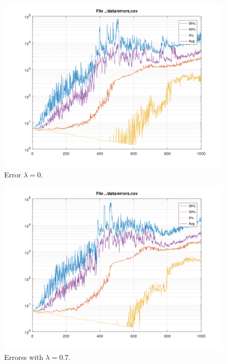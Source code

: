 \documentclass[a4paper,11pt]{article}
\begin{document}
\begin{figure}
	\includegraphics[width=\linewidth]{errors-0.png}
	\caption{Error $\lambda=0$.}
	\label{fig:errors01}
\end{figure}
\begin{figure}
	\includegraphics[width=\linewidth]{errors-07.png}
	\caption{Errorss with $\lambda=0.7$.}
	\label{fig:error07}
\end{figure}
\end{document}
